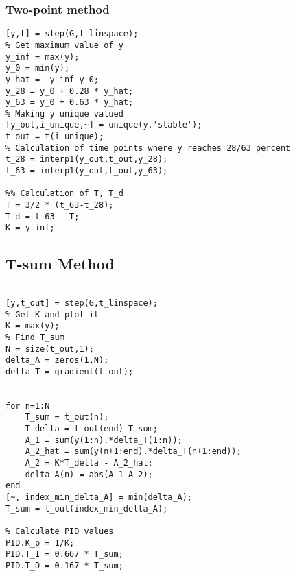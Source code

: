 \subsubsection{Two-point method} \label{app:ZN:2p_method}

\begin{lstlisting}[style=Matlab-editor,caption={Implementation of two-point method in Matlab.},captionpos=b,label={list:app:two_point_method}]
[y,t] = step(G,t_linspace);
% Get maximum value of y
y_inf = max(y);
y_0 = min(y);
y_hat =  y_inf-y_0;
y_28 = y_0 + 0.28 * y_hat;
y_63 = y_0 + 0.63 * y_hat;
% Making y unique valued
[y_out,i_unique,~] = unique(y,'stable');
t_out = t(i_unique);
% Calculation of time points where y reaches 28/63 percent
t_28 = interp1(y_out,t_out,y_28);
t_63 = interp1(y_out,t_out,y_63);

%% Calculation of T, T_d
T = 3/2 * (t_63-t_28);
T_d = t_63 - T;
K = y_inf;

\end{lstlisting}


\subsection*{T-sum Method}

\begin{lstlisting}[style=Matlab-editor,caption={Implementation of two-point method in Matlab.},captionpos=b,label={list:app:two_point_method}]
    
[y,t_out] = step(G,t_linspace);
% Get K and plot it
K = max(y);
% Find T_sum
N = size(t_out,1);
delta_A = zeros(1,N);
delta_T = gradient(t_out);


for n=1:N
    T_sum = t_out(n);
    T_delta = t_out(end)-T_sum;
    A_1 = sum(y(1:n).*delta_T(1:n));
    A_2_hat = sum(y(n+1:end).*delta_T(n+1:end));
    A_2 = K*T_delta - A_2_hat;
    delta_A(n) = abs(A_1-A_2);
end
[~, index_min_delta_A] = min(delta_A);
T_sum = t_out(index_min_delta_A);

% Calculate PID values
PID.K_p = 1/K;
PID.T_I = 0.667 * T_sum;
PID.T_D = 0.167 * T_sum;
\end{lstlisting}




